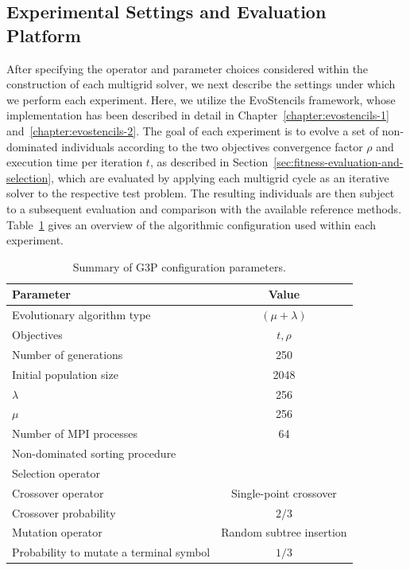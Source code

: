 \subsection{Experimental Settings and Evaluation Platform}
\label{sec:optimization-settings}
After specifying the operator and parameter choices considered within the construction of each multigrid solver, we next describe the settings under which we perform each experiment.
Here, we utilize the EvoStencils framework, whose implementation has been described in detail in Chapter~\ref{chapter:evostencils-1} and~\ref{chapter:evostencils-2}.
The goal of each experiment is to evolve a set of non-dominated individuals according to the two objectives convergence factor $\rho$ and execution time per iteration $t$, as described in Section~\ref{sec:fitness-evaluation-and-selection}, which are evaluated by applying each multigrid cycle as an iterative solver to the respective test problem.
The resulting individuals are then subject to a subsequent evaluation and comparison with the available reference methods. 
Table~\ref{table:gp-parameters} gives an overview of the algorithmic configuration used within each experiment.
\begin{table}
	\centering
	\caption{Summary of G3P configuration parameters.}
	\label{table:gp-parameters}
	\begin{tabular}{l c}
		\toprule
		Parameter & Value \\
		\midrule 
		Evolutionary algorithm type & $(\mu + \lambda)$ \\
		\midrule
		Objectives & $t, \rho$ \\
		\midrule
		Number of generations & 250 \\
		\midrule
		Initial population size & 2048 \\
		\midrule
		$\lambda$ & 256 \\
		\midrule
		$\mu$ & 256 \\
		\midrule
		Number of MPI processes & 64 \\
		\midrule
		Non-dominated sorting procedure & \cite{deb2002fast} \\ 
		\midrule
		Selection operator & \cite{deb2002fast} \\ 
		\midrule
		Crossover operator & Single-point crossover \\
		\midrule
		Crossover probability & $2/3$ \\
		\midrule
		Mutation operator & Random subtree insertion \\
		\midrule 
		Probability to mutate a terminal symbol & $1/3$ \\
		\bottomrule
	\end{tabular}
\end{table}
